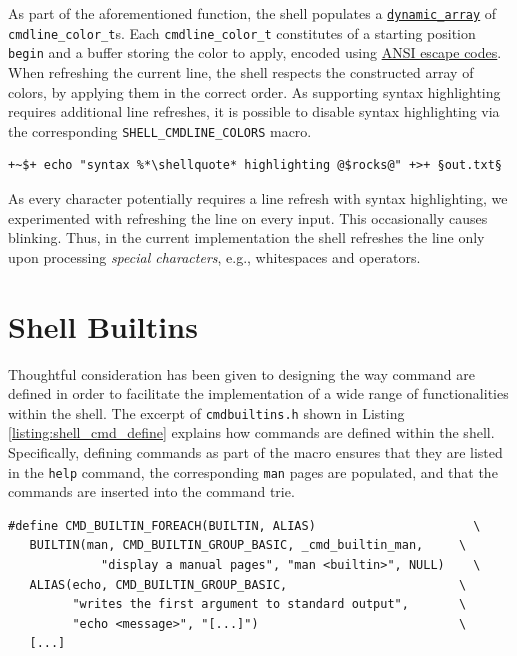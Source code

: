 As part of the aforementioned function, the shell populates a \href{https://en.wikipedia.org/wiki/Dynamic_array}{\texttt{dynamic\_array}} of \texttt{cmdline\_color\_t}s. Each \texttt{cmdline\_color\_t} constitutes of a starting position \texttt{begin} and a buffer storing the color to apply, encoded using \href{https://en.wikipedia.org/wiki/ANSI_escape_code}{ANSI escape codes}. When refreshing the current line, the shell respects the constructed array of colors, by applying them in the correct order. As supporting syntax highlighting requires additional line refreshes, it is possible to disable syntax highlighting via the corresponding \texttt{SHELL\_CMDLINE\_COLORS} macro.

\begin{lstlisting}[style=ShellInputStyle]
 +~$+ echo "syntax %*\shellquote* highlighting @$rocks@" +>+ §out.txt§
\end{lstlisting}

As every character potentially requires a line refresh with syntax highlighting, we experimented with refreshing the line on every input. This occasionally causes blinking. Thus, in the current implementation the shell refreshes the line only upon processing \emph{special characters}, e.g.,  whitespaces and  operators.


\section{Shell Builtins} \label{sec:shell_builtin}

Thoughtful consideration has been given to designing the way command are defined in order to facilitate the implementation of a wide range of functionalities within the shell. The excerpt of \texttt{cmdbuiltins.h} shown in Listing \ref{listing:shell_cmd_define} explains how commands are defined within the shell. Specifically, defining commands as part of the macro ensures that they are listed in the \texttt{help} command, the corresponding \texttt{man} pages are populated, and that the commands are inserted into the command trie.

\begin{lstlisting}[caption={Shell: Defining \texttt{BUILTIN}s and \texttt{ALIAS}es as Part of the Shell},label={listing:shell_cmd_define}]
#define CMD_BUILTIN_FOREACH(BUILTIN, ALIAS) 	                 \
   BUILTIN(man, CMD_BUILTIN_GROUP_BASIC, _cmd_builtin_man,     \
	         "display a manual pages", "man <builtin>", NULL)    \
   ALIAS(echo, CMD_BUILTIN_GROUP_BASIC,                        \
         "writes the first argument to standard output",       \
         "echo <message>", "[...]")                            \
   [...]\end{lstlisting}

